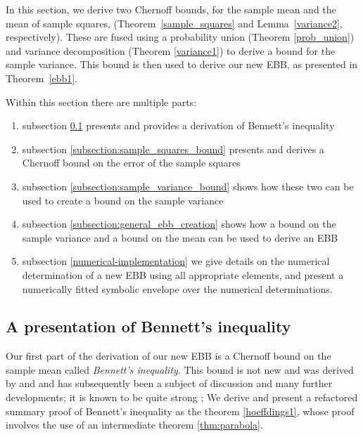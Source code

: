 In this section, we derive two Chernoff bounds, for the sample mean and the mean of sample squares, (Theorem~\ref{sample_squares} and Lemma~\ref{variance2}, respectively). 
These are fused using a probability union (Theorem \ref{prob_union}) and variance decomposition (Theorem \ref{variance1}) to derive a bound for the sample variance. This bound is then used to derive our new EBB, as presented in Theorem~\ref{ebb1}.

Within this section there are multiple parts:
\begin{enumerate}
\item	subsection \ref{subsection:bennetts_inequality} presents and provides a derivation of Bennett's inequality
\item	subsection \ref{subsection:sample_squares_bound} presents and derives a Chernoff bound on the error of the sample squares
\item	subsection \ref{subsection:sample_variance_bound} shows how these two can be used to create a bound on the sample variance
\item	subsection \ref{subsection:general_ebb_creation} shows how a bound on the sample variance and a bound on the mean can be used to derive an EBB
\item	subsection \ref{numerical-implementation} we give details on the numerical determination of a new EBB using all appropriate elements, and present a numerically fitted symbolic envelope over the numerical determinations. 
\end{enumerate}


\subsection{A presentation of Bennett's inequality}\label{subsection:bennetts_inequality}

Our first part of the derivation of our new EBB is a Chernoff bound on the sample mean called \textit{Bennett's inequality}. 
This bound is not new and was derived by \cite{hoeffding1} and \cite{10.2307/2282438} and has subsequently been a subject of discussion and many further developments; it is known to be quite strong \citep{Bentkus08boundsfor,Pinelis2014,zbMATH00812598}; 
We derive and present a refactored summary proof of Bennett's inequality as the theorem \ref{hoeffdings1}, whose proof involves the use of an intermediate theorem \ref{thm:parabola}.

